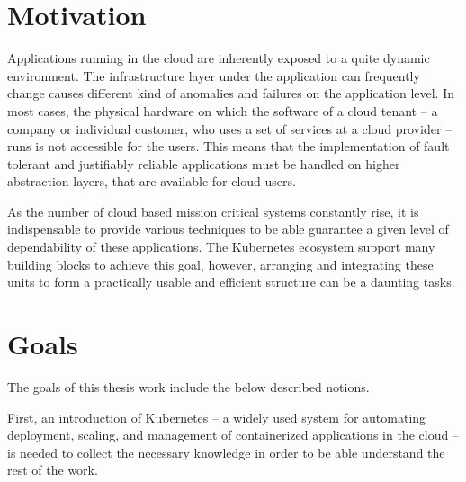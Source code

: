 \section{Motivation}

Applications running in the cloud are inherently exposed to a quite dynamic environment. The infrastructure layer under the application can frequently change causes different kind of anomalies and failures on the application level. In most cases, the physical hardware on which the software of a cloud tenant -- a company or individual customer, who uses a set of services at a cloud provider -- runs is not accessible for the users. This means that the implementation of fault tolerant and justifiably reliable applications must be handled on higher abstraction layers, that are available for cloud users.

As the number of cloud based mission critical systems constantly rise, it is indispensable to provide various techniques to be able guarantee a given level of dependability of these applications. The Kubernetes ecosystem support many building blocks to achieve this goal, however, arranging and integrating these units to form a practically usable and efficient structure can be a daunting tasks.


\section{Goals}

The goals of this thesis work include the below described notions.

First, an introduction of Kubernetes -- a widely used system for automating deployment, scaling, and management of containerized applications in the cloud -- is needed to collect the necessary knowledge in order to be able understand the rest of the work.

